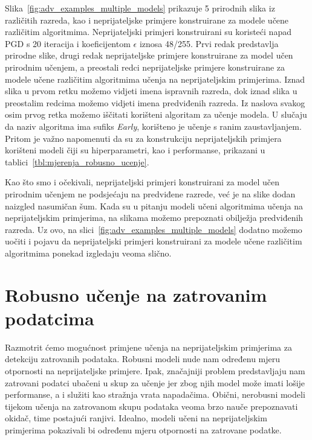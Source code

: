 \documentclass[times, utf8, zavrsni, numeric]{fer}
\begin{document}
Slika~\ref{fig:adv_examples_multiple_models} prikazuje 5 prirodnih slika iz različitih razreda, kao i neprijateljske primjere konstruirane za modele učene različitim algoritmima.
Neprijateljski primjeri konstruirani su koristeći napad PGD s 20 iteracija i koeficijentom $\epsilon$ iznosa 48/255. 
Prvi redak predstavlja prirodne slike, drugi redak neprijateljske primjere konstruirane za model učen prirodnim učenjem, a preostali redci neprijateljske primjere konstruirane za modele učene različitim algoritmima učenja na neprijateljskim primjerima.
Iznad slika u prvom retku možemo vidjeti imena ispravnih razreda, dok iznad slika u preostalim redcima možemo vidjeti imena predviđenih razreda.
Iz naslova svakog osim prvog retka možemo iščitati korišteni algoritam za učenje modela. U slučaju da naziv algoritma ima sufiks \textit{Early}, korišteno je učenje s ranim zaustavljanjem.
Pritom je važno napomenuti da su za konstrukciju neprijateljskih primjera korišteni modeli čiji su hiperparametri, kao i performanse, prikazani u tablici~\ref{tbl:mjerenja_robusno_ucenje}.

Kao što smo i očekivali, neprijateljski primjeri konstruirani za model učen prirodnim učenjem ne podsjećaju na predviđene razrede, već je na slike dodan naizgled nasumičan šum.
Kada su u pitanju modeli učeni algoritmima učenja na neprijateljskim primjerima, na slikama možemo prepoznati obilježja predviđenih razreda.
Uz ovo, na slici~\ref{fig:adv_examples_multiple_models} dodatno možemo uočiti i pojavu da neprijateljski primjeri konstruirani za modele učene različitim algoritmima ponekad izgledaju veoma slično.

\pagebreak

\section{Robusno učenje na zatrovanim podatcima}

Razmotrit ćemo mogućnost primjene učenja na neprijateljskim primjerima za detekciju zatrovanih podataka.
Robusni modeli nude nam određenu mjeru otpornosti na neprijateljske primjere. 
Ipak, značajniji problem predstavljaju nam zatrovani podatci ubačeni u skup za učenje jer zbog njih model može imati lošije performanse, a i služiti kao stražnja vrata napadačima.
Obični, nerobusni modeli tijekom učenja na zatrovanom skupu podataka veoma brzo nauče prepoznavati okidač, time postajući ranjivi.
Idealno, modeli učeni na neprijateljskim primjerima pokazivali bi određenu mjeru otpornosti na zatrovane podatke.
\end{document}
